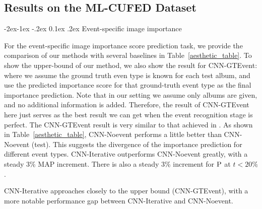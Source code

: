 \documentclass[runningheads]{llncs}
\makeatletter
\renewcommand\subsubsection{\@startsection{subsubsection}{3}{\z@}%
                {-2ex\@plus -1ex \@minus -.2ex}%
                {0.1ex \@plus .2ex}%
                {\normalfont\normalsize\bfseries}}
\makeatother
\begin{document}
\subsection{Results on the ML-CUFED Dataset}
\subsubsection{Event-specific image importance}

For the event-specific image importance score prediction task, we provide the comparison of our methods with several baselines in Table~\ref{aesthetic_table}. To show the upper-bound of our method, we also show the result for CNN-GTEvent: where we assume the ground truth even type is known for each test album,  and use the predicted importance score for that ground-truth event type as the final importance prediction. Note that in our setting we assume only albums are given, and no additional information is added. Therefore, the result of CNN-GTEvent here just serves as the best result we can get when the event recognition stage is perfect. The CNN-GTEvent result is very similar to that achieved in \cite{CVPR}. As shown in Table~\ref{aesthetic_table}, CNN-Noevent performs a little better than CNN-Noevent (test). This suggests the divergence of the importance prediction for different event types. CNN-Iterative outperforms CNN-Noevent greatly, with a steady 3\% MAP increment. There is also a steady 3\% increment for $\textup{P}$ at $t<20\%$.

CNN-Iterative approaches closely to the upper bound (CNN-GTEvent), with a more notable performance gap between CNN-Iterative and CNN-Noevent.
\end{document}
